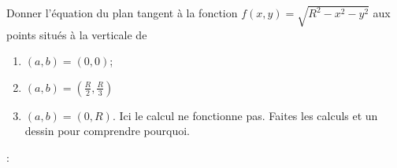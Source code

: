 
\begin{exercice}\label{exoOutilsMath-0046}

    Donner l'équation du plan tangent à la fonction $f(x,y)=\sqrt{R^2-x^2-y^2}$ aux points situés à la verticale de
    \begin{enumerate}
        \item
            $(a,b)=(0,0)$;
        \item
            $(a,b)=(\frac{ R }{2},\frac{ R }{ 3 })$
        \item
            $(a,b)=(0,R)$. Ici le calcul ne fonctionne pas. Faites les calculs et un dessin pour comprendre pourquoi.
    \end{enumerate}

\end{exercice}:

